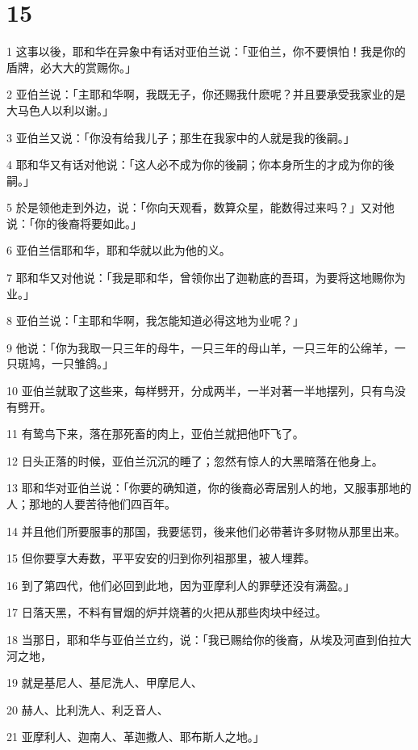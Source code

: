\chapter{15}

\par 1 这事以後，耶和华在异象中有话对亚伯兰说：「亚伯兰，你不要惧怕！我是你的盾牌，必大大的赏赐你。」
\par 2 亚伯兰说：「主耶和华啊，我既无子，你还赐我什麽呢？并且要承受我家业的是大马色人以利以谢。」
\par 3 亚伯兰又说：「你没有给我儿子；那生在我家中的人就是我的後嗣。」
\par 4 耶和华又有话对他说：「这人必不成为你的後嗣；你本身所生的才成为你的後嗣。」
\par 5 於是领他走到外边，说：「你向天观看，数算众星，能数得过来吗？」又对他说：「你的後裔将要如此。」
\par 6 亚伯兰信耶和华，耶和华就以此为他的义。
\par 7 耶和华又对他说：「我是耶和华，曾领你出了迦勒底的吾珥，为要将这地赐你为业。」
\par 8 亚伯兰说：「主耶和华啊，我怎能知道必得这地为业呢？」
\par 9 他说：「你为我取一只三年的母牛，一只三年的母山羊，一只三年的公绵羊，一只斑鸠，一只雏鸽。」
\par 10 亚伯兰就取了这些来，每样劈开，分成两半，一半对著一半地摆列，只有鸟没有劈开。
\par 11 有鸷鸟下来，落在那死畜的肉上，亚伯兰就把他吓飞了。
\par 12 日头正落的时候，亚伯兰沉沉的睡了；忽然有惊人的大黑暗落在他身上。
\par 13 耶和华对亚伯兰说：「你要的确知道，你的後裔必寄居别人的地，又服事那地的人；那地的人要苦待他们四百年。
\par 14 并且他们所要服事的那国，我要惩罚，後来他们必带著许多财物从那里出来。
\par 15 但你要享大寿数，平平安安的归到你列祖那里，被人埋葬。
\par 16 到了第四代，他们必回到此地，因为亚摩利人的罪孽还没有满盈。」
\par 17 日落天黑，不料有冒烟的炉并烧著的火把从那些肉块中经过。
\par 18 当那日，耶和华与亚伯兰立约，说：「我已赐给你的後裔，从埃及河直到伯拉大河之地，
\par 19 就是基尼人、基尼洗人、甲摩尼人、
\par 20 赫人、比利洗人、利乏音人、
\par 21 亚摩利人、迦南人、革迦撒人、耶布斯人之地。」

